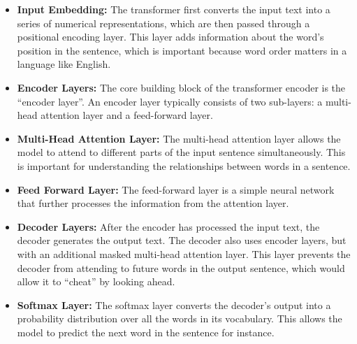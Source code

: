 \begin{itemize}
    \item \textbf{Input Embedding:} The transformer first converts the input text into a series of numerical representations,  which are then passed through a positional encoding layer. This layer adds information about the word’s position in the sentence, which is important because word order matters in a language like English.
    \item \textbf{Encoder Layers:} The core building block of the transformer encoder is the “encoder layer”.  An encoder layer typically consists of two sub-layers: a multi-head attention layer and a feed-forward layer.
    \item \textbf{Multi-Head Attention Layer:} The multi-head attention layer allows the model to attend to different parts of the input sentence simultaneously. This is important for understanding the relationships between words in a sentence.
    \item \textbf{Feed Forward Layer:} The feed-forward layer is a simple neural network that further processes the information from the attention layer.
    \item \textbf{Decoder Layers:} After the encoder has processed the input text, the decoder generates the output text. The decoder also uses encoder layers, but with an additional masked multi-head attention layer. This layer prevents the decoder from attending to future words in the output sentence, which would allow it to “cheat” by looking ahead.
    \item \textbf{Softmax Layer:} The softmax layer converts the decoder’s output into a probability distribution over all the words in its vocabulary. This allows the model to predict the next word in the sentence for instance.
\end{itemize}
\newpage

